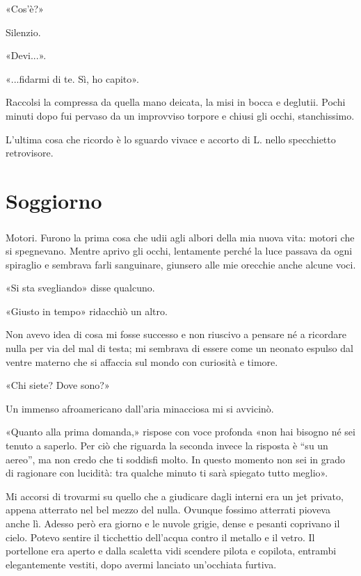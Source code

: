 \documentclass[a4paper,12pt]{book}
\begin{document}
«Cos'è?»

Silenzio.

«Devi...».

«...fidarmi di te. Sì, ho capito».

Raccolsi la compressa da quella mano deicata, la misi in bocca e deglutii. Pochi
minuti dopo fui pervaso da un improvviso torpore e chiusi gli occhi,
stanchissimo.

L'ultima cosa che ricordo è lo sguardo vivace e accorto di L. nello
specchietto retrovisore.

\chapter{Soggiorno}

\paragraph{}
Motori. Furono la prima cosa che udii agli albori della mia nuova vita: motori
che si spegnevano. Mentre aprivo gli occhi, lentamente perché la luce passava
da ogni spiraglio e sembrava farli sanguinare, giunsero alle mie orecchie anche
alcune voci.

«Si sta svegliando» disse qualcuno.

«Giusto in tempo» ridacchiò un altro.

Non avevo idea di cosa mi fosse successo e non riuscivo a pensare né a
ricordare nulla per via del mal di testa; mi sembrava di essere come un neonato
espulso dal ventre materno che si affaccia sul mondo con curiosità e timore.

«Chi siete? Dove sono?»

Un immenso afroamericano dall'aria minacciosa mi si avvicinò.

«Quanto alla prima domanda,» rispose con voce profonda «non hai bisogno né
sei tenuto a saperlo. Per ciò che riguarda la seconda invece la risposta è
``su un aereo'', ma non credo che ti soddisfi molto. In questo momento non sei
in grado di ragionare con lucidità: tra qualche minuto ti sarà spiegato tutto
meglio».

Mi accorsi di trovarmi su quello che a giudicare dagli interni era un jet
privato, appena atterrato nel bel mezzo del nulla. Ovunque fossimo atterrati
pioveva anche lì. Adesso però era giorno e le nuvole grigie, dense e pesanti
coprivano il cielo. Potevo sentire il ticchettio dell'acqua contro il metallo
e il vetro. Il portellone era aperto e dalla scaletta vidi scendere pilota e
copilota, entrambi elegantemente vestiti, dopo avermi lanciato un'occhiata
furtiva.
\end{document}
